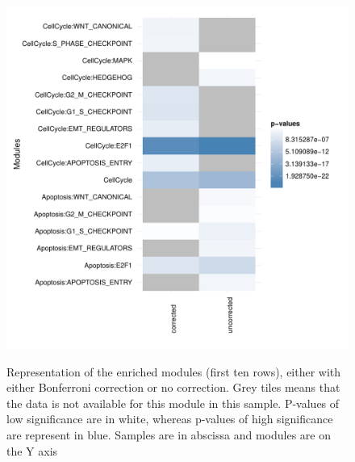\documentclass[article]{jss}
\begin{document}
\begin{figure}
	\centering
	\caption{Representation of the enriched modules (first ten rows), either with either Bonferroni correction or no correction. Grey tiles means that the data is not available for this module in this sample. P-values of low significance are in white, whereas p-values of high significance are represent in blue. Samples are in abscissa and modules are on the Y axis  }
	\includegraphics{figures/comparison_corrected_unc.pdf}
    \label{fig:heatm}

\end{figure}
\end{document}
